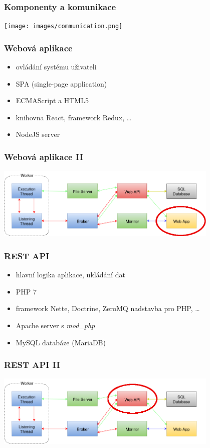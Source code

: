 \documentclass{beamer}
\begin{document}
\begin{frame}
	\frametitle{Komponenty a komunikace}
	\begin{center}
		\texttt{[image: images/communication.png]}
	\end{center}
\end{frame}

\begin{frame}
	\frametitle{Webová aplikace}
	\begin{itemize}
		\item ovládání systému uživateli
		\item SPA (single-page application)
		\item ECMAScript a HTML5
		\item knihovna React, framework Redux, \dots
		\item NodeJS server
	\end{itemize}
\end{frame}

\begin{frame}
	\frametitle{Webová aplikace II}
	\begin{center}
		\includegraphics[width=0.8\textwidth]{images/communication-webapp.png}
	\end{center}
\end{frame}

\begin{frame}
	\frametitle{REST API}
	\begin{itemize}
		\item hlavní logika aplikace, ukládání dat
		\item PHP 7
		\item framework Nette, Doctrine, ZeroMQ nadstavba pro PHP, \dots
		\item Apache server s \it{mod\_php}
		\item MySQL databáze (MariaDB)
	\end{itemize}
\end{frame}

\begin{frame}
	\frametitle{REST API II}
	\begin{center}
		\includegraphics[width=0.8\textwidth]{images/communication-webapi.png}
	\end{center}
\end{frame}
\end{document}
